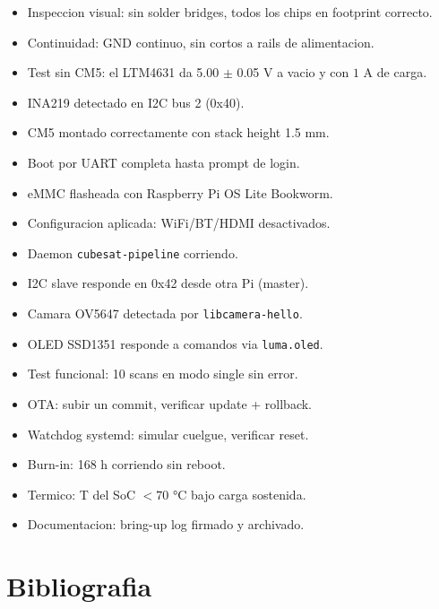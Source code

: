 \documentclass[11pt,a4paper,oneside,openright]{book}
\begin{document}
\begin{itemize}[leftmargin=2em]
  \item[$\square$] Inspeccion visual: sin solder bridges, todos los chips en footprint correcto.
  \item[$\square$] Continuidad: GND continuo, sin cortos a rails de alimentacion.
  \item[$\square$] Test sin CM5: el LTM4631 da 5.00 $\pm$ 0.05 V a vacio y con $1$ A de carga.
  \item[$\square$] INA219 detectado en I2C bus 2 (0x40).
  \item[$\square$] CM5 montado correctamente con stack height 1.5 mm.
  \item[$\square$] Boot por UART completa hasta prompt de login.
  \item[$\square$] eMMC flasheada con Raspberry Pi OS Lite Bookworm.
  \item[$\square$] Configuracion aplicada: WiFi/BT/HDMI desactivados.
  \item[$\square$] Daemon \texttt{cubesat-pipeline} corriendo.
  \item[$\square$] I2C slave responde en 0x42 desde otra Pi (master).
  \item[$\square$] Camara OV5647 detectada por \texttt{libcamera-hello}.
  \item[$\square$] OLED SSD1351 responde a comandos via \texttt{luma.oled}.
  \item[$\square$] Test funcional: 10 scans en modo single sin error.
  \item[$\square$] OTA: subir un commit, verificar update + rollback.
  \item[$\square$] Watchdog systemd: simular cuelgue, verificar reset.
  \item[$\square$] Burn-in: 168 h corriendo sin reboot.
  \item[$\square$] Termico: T del SoC $< 70$ °C bajo carga sostenida.
  \item[$\square$] Documentacion: bring-up log firmado y archivado.
\end{itemize}

\backmatter

\chapter*{Bibliografia}
\end{document}
